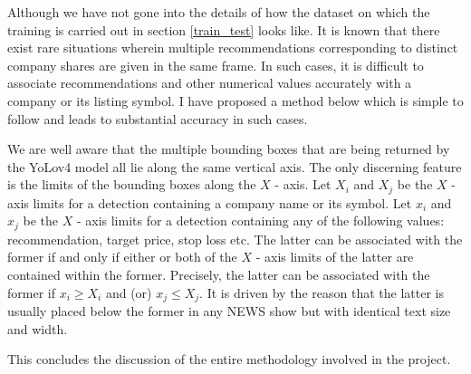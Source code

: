 Although we have not gone into the details of how the dataset on which the training is carried out in section \ref{train_test} looks like. It is known that there exist rare situations wherein multiple recommendations corresponding to distinct company shares are given in the same frame. In such cases, it is difficult to associate recommendations and other numerical values accurately with a company or its listing symbol. I have proposed a method below which is simple to follow and leads to substantial accuracy in such cases. \par

We are well aware that the multiple bounding boxes that are being returned by the YoLov4 model all lie along the same vertical axis. The only discerning feature is the limits of the bounding boxes along the $X$ - axis. Let $X_i$ and $X_j$ be the $X$ - axis limits for a detection containing a company name or its symbol. Let $x_i$ and $x_j$ be the $X$ - axis limits for a detection containing any of the following values: recommendation, target price, stop loss etc. The latter can be associated with the former if and only if either or both of the $X$ - axis limits of the latter are contained within the former. Precisely, the latter can be associated with the former if $x_{i} \geqslant X_{i}$ and (or)  $x_{j} \leqslant X_{j}$. It is driven by the reason that the latter is usually placed below the former in any NEWS show but with identical text size and width. \par

This concludes the discussion of the entire methodology involved in the project.
